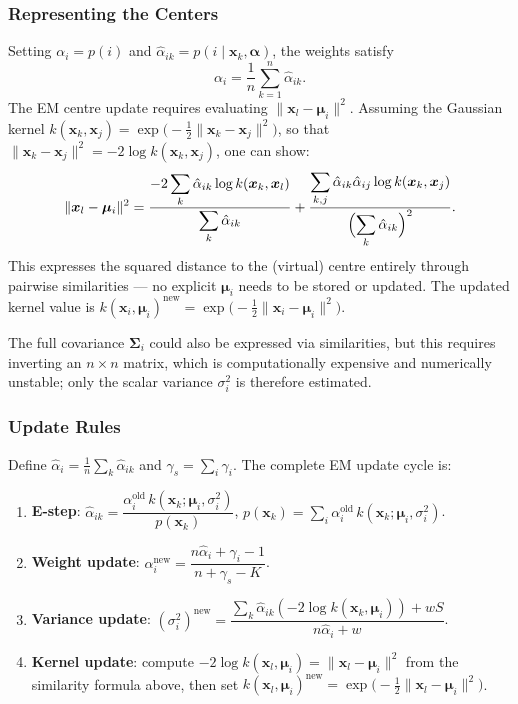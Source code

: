 \documentclass[11pt, oneside]{book}
\begin{document}
\subsubsection{Representing the Centers}

Setting $\alpha_i = p(i)$ and $\hat\alpha_{ik} = p(i\mid\bm{x}_k,\bm{\alpha})$,
the weights satisfy
\[
  \alpha_i = \frac{1}{n}\sum_{k=1}^n \hat\alpha_{ik}.
\]
The EM centre update requires evaluating $\|\bm{x}_l - \bm{\mu}_i\|^2$.
Assuming the Gaussian kernel
$k(\bm{x}_k,\bm{x}_j)=\exp\!\bigl(-\tfrac{1}{2}\|\bm{x}_k-\bm{x}_j\|^2\bigr)$,
so that $\|\bm{x}_k-\bm{x}_j\|^2 = -2\log k(\bm{x}_k,\bm{x}_j)$,
one can show:
\[
  \|\bm{x}_l - \bm{\mu}_i\|^2
  = \frac{\displaystyle-2\sum_k \hat\alpha_{ik}\log k(\bm{x}_k,\bm{x}_l)}{\displaystyle\sum_k \hat\alpha_{ik}}
    + \frac{\displaystyle\sum_{k,j}\hat\alpha_{ik}\hat\alpha_{ij}\log k(\bm{x}_k,\bm{x}_j)}
           {\displaystyle\Bigl(\sum_k \hat\alpha_{ik}\Bigr)^2}.
\]
This expresses the squared distance to the (virtual) centre entirely through
pairwise similarities — no explicit $\bm{\mu}_i$ needs to be stored or
updated.
The updated kernel value is
$k(\bm{x}_i,\bm{\mu}_i)^{\text{new}} = \exp\!\bigl(-\tfrac{1}{2}\|\bm{x}_i-\bm{\mu}_i\|^2\bigr)$.

The full covariance $\bm{\Sigma}_i$ could also be expressed via similarities,
but this requires inverting an $n\times n$ matrix, which is computationally
expensive and numerically unstable; only the scalar variance $\sigma_i^2$ is
therefore estimated.

\subsubsection{Update Rules}

Define $\hat\alpha_i = \tfrac{1}{n}\sum_k \hat\alpha_{ik}$ and
$\gamma_s = \sum_i \gamma_i$.
The complete EM update cycle is:

\begin{enumerate}
  \item \textbf{E-step}: $\hat\alpha_{ik} = \dfrac{\alpha_i^{\text{old}}\,k(\bm{x}_k;\bm{\mu}_i,\sigma_i^2)}{p(\bm{x}_k)}$,\quad
        $p(\bm{x}_k) = \sum_i \alpha_i^{\text{old}}\,k(\bm{x}_k;\bm{\mu}_i,\sigma_i^2)$.
  \item \textbf{Weight update}: $\alpha_i^{\text{new}} = \dfrac{n\hat\alpha_i + \gamma_i - 1}{n+\gamma_s-K}$.
  \item \textbf{Variance update}:
        $(\sigma_i^2)^{\text{new}} = \dfrac{\displaystyle\sum_k \hat\alpha_{ik}(-2\log k(\bm{x}_k,\bm{\mu}_i)) + wS}{\displaystyle n\hat\alpha_i + w}$.
  \item \textbf{Kernel update}: compute $-2\log k(\bm{x}_l,\bm{\mu}_i) = \|\bm{x}_l-\bm{\mu}_i\|^2$
        from the similarity formula above, then set
        $k(\bm{x}_l,\bm{\mu}_i)^{\text{new}} = \exp\!\bigl(-\tfrac{1}{2}\|\bm{x}_l-\bm{\mu}_i\|^2\bigr)$.
\end{enumerate}
\end{document}

